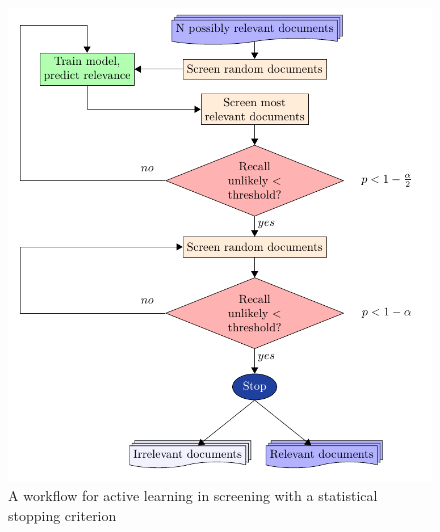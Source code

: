 \documentclass{bmcart}
\begin{document}
	\medskip
	
	\begin{figure}
		\includegraphics[width=0.5\linewidth]{../images/flow}
		\caption{A workflow for active learning in screening with a statistical stopping criterion}
		\label{flow}
	\end{figure}

%	
\end{document}

